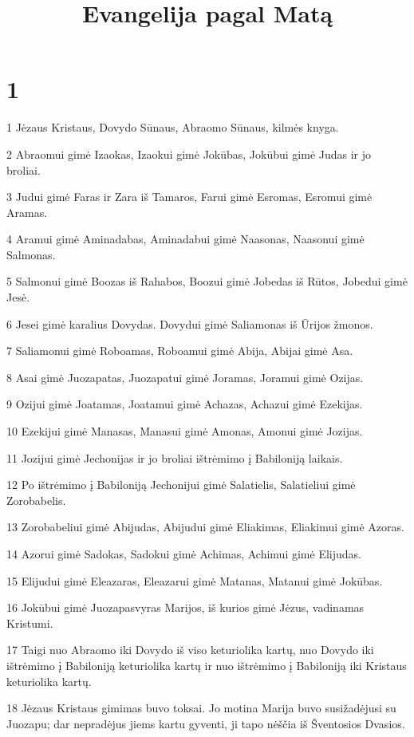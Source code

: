 

\title{Evangelija pagal Matą}

\chapter{1}


\par 1 Jėzaus Kristaus, Dovydo Sūnaus, Abraomo Sūnaus, kilmės knyga. 
\par 2 Abraomui gimė Izaokas, Izaokui gimė Jokūbas, Jokūbui gimė Judas ir jo broliai. 
\par 3 Judui gimė Faras ir Zara iš Tamaros, Farui gimė Esromas, Esromui gimė Aramas. 
\par 4 Aramui gimė Aminadabas, Aminadabui gimė Naasonas, Naasonui gimė Salmonas. 
\par 5 Salmonui gimė Boozas iš Rahabos, Boozui gimė Jobedas iš Rūtos, Jobedui gimė Jesė. 
\par 6 Jesei gimė karalius Dovydas. Dovydui gimė Saliamonas iš Ūrijos žmonos. 
\par 7 Saliamonui gimė Roboamas, Roboamui gimė Abija, Abijai gimė Asa. 
\par 8 Asai gimė Juozapatas, Juozapatui gimė Joramas, Joramui gimė Ozijas. 
\par 9 Ozijui gimė Joatamas, Joatamui gimė Achazas, Achazui gimė Ezekijas. 
\par 10 Ezekijui gimė Manasas, Manasui gimė Amonas, Amonui gimė Jozijas. 
\par 11 Jozijui gimė Jechonijas ir jo broliai ištrėmimo į Babiloniją laikais. 
\par 12 Po ištrėmimo į Babiloniją Jechonijui gimė Salatielis, Salatieliui gimė Zorobabelis. 
\par 13 Zorobabeliui gimė Abijudas, Abijudui gimė Eliakimas, Eliakimui gimė Azoras. 
\par 14 Azorui gimė Sadokas, Sadokui gimė Achimas, Achimui gimė Elijudas. 
\par 15 Elijudui gimė Eleazaras, Eleazarui gimė Matanas, Matanui gimė Jokūbas. 
\par 16 Jokūbui gimė Juozapas­vyras Marijos, iš kurios gimė Jėzus, vadinamas Kristumi. 
\par 17 Taigi nuo Abraomo iki Dovydo iš viso keturiolika kartų, nuo Dovydo iki ištrėmimo į Babiloniją keturiolika kartų ir nuo ištrėmimo į Babiloniją iki Kristaus keturiolika kartų. 
\par 18 Jėzaus Kristaus gimimas buvo toksai. Jo motina Marija buvo susižadėjusi su Juozapu; dar nepradėjus jiems kartu gyventi, ji tapo nėščia iš Šventosios Dvasios. 
